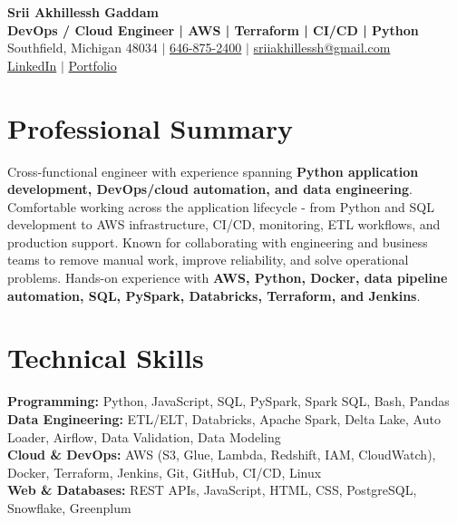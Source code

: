\documentclass[letterpaper,10pt]{article}
\begin{document}
\fontsize{9.35pt}{10.45pt}\selectfont

\begin{center}
    {\LARGE \textbf{Srii Akhillessh Gaddam}} \\[-1pt]
    \textbf{DevOps / Cloud Engineer | AWS | Terraform | CI/CD | Python} \\[2pt]
    Southfield, Michigan 48034 $|$
    \href{tel:6468752400}{646-875-2400} $|$
    \href{mailto:sriiakhillessh@gmail.com}{sriiakhillessh@gmail.com} \\[1pt]
    \href{https://www.linkedin.com/in/srii-akhiilessh-gaddam-b48668191/}{LinkedIn} $|$
    \href{https://sriiakhillesshg.github.io/portfolio/}{Portfolio}
\end{center}
\vspace{-8pt}

\section{Professional Summary}
\small{Cross-functional engineer with experience spanning \textbf{Python application development, DevOps/cloud automation, and data engineering}. Comfortable working across the application lifecycle - from Python and SQL development to AWS infrastructure, CI/CD, monitoring, ETL workflows, and production support. Known for collaborating with engineering and business teams to remove manual work, improve reliability, and solve operational problems. Hands-on experience with \textbf{AWS, Python, Docker, data pipeline automation, SQL, PySpark, Databricks, Terraform, and Jenkins}.}

\section{Technical Skills}
\small{
\textbf{Programming:} Python, JavaScript, SQL, PySpark, Spark SQL, Bash, Pandas \\
\textbf{Data Engineering:} ETL/ELT, Databricks, Apache Spark, Delta Lake, Auto Loader, Airflow, Data Validation, Data Modeling \\
\textbf{Cloud \& DevOps:} AWS (S3, Glue, Lambda, Redshift, IAM, CloudWatch), Docker, Terraform, Jenkins, Git, GitHub, CI/CD, Linux \\
\textbf{Web \& Databases:} REST APIs, JavaScript, HTML, CSS, PostgreSQL, Snowflake, Greenplum
}
\end{document}
